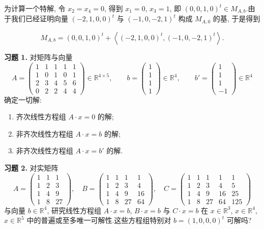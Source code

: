 为计算一个特解, 令 $x_2 = x_4 = 0$, 得到 $x_1 = 0$, $x_3 = 1$, 即 $(0, 0, 1, 0)^t \in M_{A, b}$.由于我们已经证明向量 $(-2, 1, 0, 0)^t$ 与 $(-1, 0, -2, 1)^t$ 构成 $M_{A, 0}$ 的基, 于是得到

\[
M_{A, b} = (0, 0, 1, 0)^t + \left\langle (-2, 1, 0, 0)^t, (-1, 0, -2, 1)^t \right\rangle\text{.}
\]

\aufgaben

\noindent\textbf{习题 1.} 对矩阵与向量
\[
A = \begin{pmatrix}
1 & 1 & 1 & 1 & 1 \\
1 & 0 & 1 & 0 & 1 \\
2 & 3 & 4 & 5 & 6 \\
0 & 2 & 2 & 4 & 4
\end{pmatrix} \in \mathbb{R}^{4 \times 5}, \qquad
b = \begin{pmatrix} 1 \\ 1 \\ 1 \\ 1 \end{pmatrix} \in \mathbb{R}^4, \qquad
b' = \begin{pmatrix} 1 \\ 1 \\ 1 \\ -1 \end{pmatrix} \in \mathbb{R}^4
\]
确定一切解:
\begin{enumerate}
\item[(i)] 齐次线性方程组 $A \cdot x = 0$ 的解;
\item[(ii)] 非齐次线性方程组 $A \cdot x = b$ 的解;
\item[(iii)] 非齐次线性方程组 $A \cdot x = b'$ 的解.
\end{enumerate}

\noindent\textbf{习题 2.} 对实矩阵
\[
A = \begin{pmatrix} 1 & 1 & 1 \\ 1 & 2 & 3 \\ 1 & 4 & 9 \\ 1 & 8 & 27 \end{pmatrix}, \quad
B = \begin{pmatrix} 1 & 1 & 1 & 1 \\ 1 & 2 & 3 & 4 \\ 1 & 4 & 9 & 16 \\ 1 & 8 & 27 & 64 \end{pmatrix}, \quad
C = \begin{pmatrix} 1 & 1 & 1 & 1 & 1 \\ 1 & 2 & 3 & 4 & 5 \\ 1 & 4 & 9 & 16 & 25 \\ 1 & 8 & 27 & 64 & 125 \end{pmatrix}
\]
与向量 $b \in \mathbb{R}^4$, 研究线性方程组 $A \cdot x = b$, $B \cdot x = b$ 与 $C \cdot x = b$ 在 $x \in \mathbb{R}^3$, $x \in \mathbb{R}^4$, $x \in \mathbb{R}^5$ 中的普遍或至多唯一可解性.这些方程组特别对 $b = (1, 0, 0, 0)^t$ 可解吗?


